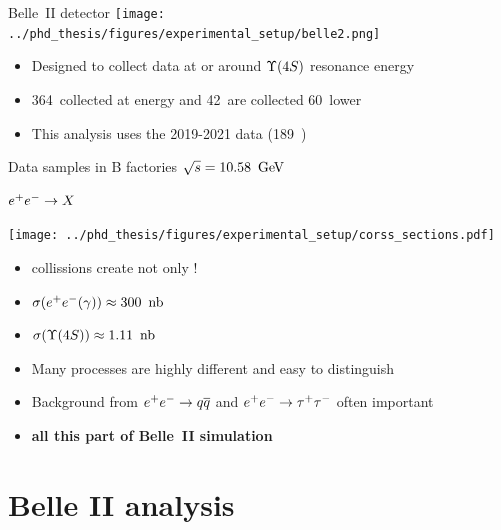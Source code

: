 \documentclass[xcolor=dvipsnames]{beamer}
\begin{document}
   \begin{frame}{Belle~II detector}
      \scriptsize\centering
      \texttt{[image: ../phd\_thesis/figures/experimental\_setup/belle2.png]}
      \begin{itemize}
         \item Designed to collect data at or around $\FourS$ resonance energy
         \item 364~\invfb collected at \FourS energy and 42~\invfb are collected 60~\mev lower
         \item This analysis uses the 2019-2021 data (189~\invfb)
      \end{itemize}
   \end{frame}


   \begin{frame}{Data samples in B factories}
      \scriptsize\centering
      \textbf{$\sqrt{s} = 10.58~\mathrm{\,Ge\kern -0.1em V}$}
      
      $e^+e^-\rightarrow X$

      \texttt{[image: ../phd\_thesis/figures/experimental\_setup/corss\_sections.pdf]}
      \begin{itemize}
         \item \epem collissions create not only \FourS!
         \item[] $\sigma({e^+e^-(\gamma)}) \approx 300~{\rm \,nb}$
         \item[] $\sigma({\FourS}) \approx 1.11~\nb$
         \item Many processes are highly different and easy to distinguish
         \item Background from $e^+e^-\rightarrow q\overline q$ and $e^+e^-\rightarrow\tau^+\tau^-$ often important
         \item[\ra] \textbf{all this part of Belle~II simulation}
      \end{itemize}
   \end{frame}

   \section{Belle II analysis}
\end{document}
